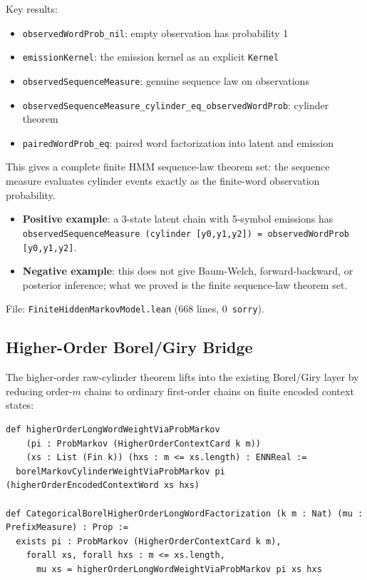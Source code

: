 \documentclass[11pt,a4paper]{article}
\theoremstyle{definition}
\begin{document}
Key results:
\begin{itemize}
\item \texttt{observedWordProb\_nil}: empty observation has probability 1
\item \texttt{emissionKernel}: the emission kernel as an explicit \texttt{Kernel}
\item \texttt{observedSequenceMeasure}: genuine sequence law on observations
\item \texttt{observedSequenceMeasure\_cylinder\_eq\_observedWordProb}: cylinder theorem
\item \texttt{pairedWordProb\_eq}: paired word factorization into latent and emission
\end{itemize}

This gives a complete finite HMM sequence-law theorem set: the sequence measure
evaluates cylinder events exactly as the finite-word observation probability.

\begin{itemize}
\item \textbf{Positive example}: a 3-state latent chain with 5-symbol emissions
  has \texttt{observedSequenceMeasure (cylinder [y0,y1,y2]) = observedWordProb [y0,y1,y2]}.
\item \textbf{Negative example}: this does not give Baum-Welch, forward-backward,
  or posterior inference; what we proved is the finite sequence-law theorem set.
\end{itemize}

File: \texttt{FiniteHiddenMarkovModel.lean} (668 lines, 0~\texttt{sorry}).

\subsection{Higher-Order Borel/Giry Bridge}

The higher-order raw-cylinder theorem lifts into the existing Borel/Giry layer
by reducing order-$m$ chains to ordinary first-order chains on finite
encoded context states:

\begin{lstlisting}
def higherOrderLongWordWeightViaProbMarkov
    (pi : ProbMarkov (HigherOrderContextCard k m))
    (xs : List (Fin k)) (hxs : m <= xs.length) : ENNReal :=
  borelMarkovCylinderWeightViaProbMarkov pi (higherOrderEncodedContextWord xs hxs)

def CategoricalBorelHigherOrderLongWordFactorization (k m : Nat) (mu : PrefixMeasure) : Prop :=
  exists pi : ProbMarkov (HigherOrderContextCard k m),
    forall xs, forall hxs : m <= xs.length,
      mu xs = higherOrderLongWordWeightViaProbMarkov pi xs hxs
\end{lstlisting}
\end{document}
